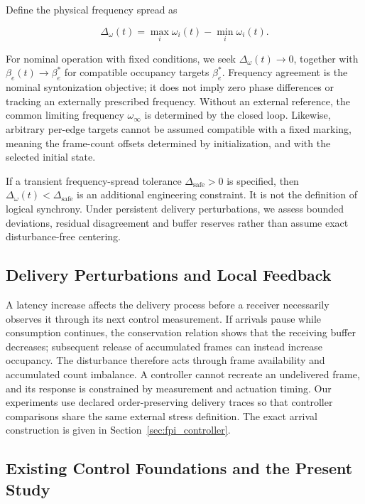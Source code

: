 Define the physical frequency spread as

\begin{equation}
\Delta_\omega(t)=\max_i\omega_i(t)-\min_i\omega_i(t).
\end{equation}

For nominal operation with fixed conditions, we seek $\Delta_\omega(t)\to0$, together with $\beta_e(t)\to\beta_e^*$ for compatible occupancy targets $\beta_e^*$. Frequency agreement is the nominal syntonization objective; it does not imply zero phase differences or tracking an externally prescribed frequency. Without an external reference, the common limiting frequency $\omega_\infty$ is determined by the closed loop. Likewise, arbitrary per-edge targets cannot be assumed compatible with a fixed marking, meaning the frame-count offsets determined by initialization, and with the selected initial state.

If a transient frequency-spread tolerance $\Delta_{\mathrm{safe}}>0$ is specified, then $\Delta_\omega(t)<\Delta_{\mathrm{safe}}$ is an additional engineering constraint. It is not the definition of logical synchrony. Under persistent delivery perturbations, we assess bounded deviations, residual disagreement and buffer reserves rather than assume exact disturbance-free centering.

\subsection{Delivery Perturbations and Local Feedback}

A latency increase affects the delivery process before a receiver necessarily observes it through its next control measurement. If arrivals pause while consumption continues, the conservation relation shows that the receiving buffer decreases; subsequent release of accumulated frames can instead increase occupancy. The disturbance therefore acts through frame availability and accumulated count imbalance. A controller cannot recreate an undelivered frame, and its response is constrained by measurement and actuation timing. Our experiments use declared order-preserving delivery traces so that controller comparisons share the same external stress definition. The exact arrival construction is given in Section~\ref{sec:fpi_controller}.

\subsection{Existing Control Foundations and the Present Study}

